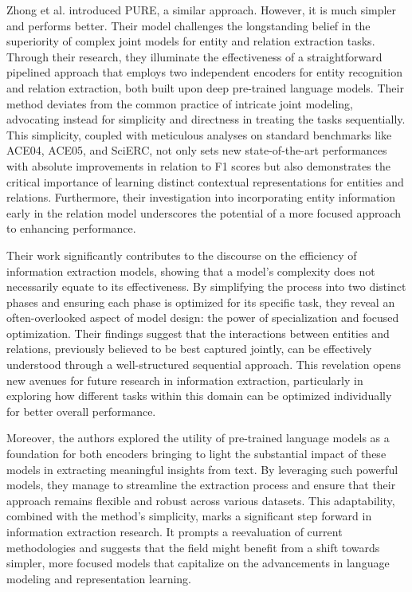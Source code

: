 Zhong et al. \cite{Zhong2020AFE} introduced \ac{PURE}, a similar approach. However, it is much simpler and performs better. Their model challenges the longstanding belief in the superiority of complex joint models for entity and relation extraction tasks. Through their research, they illuminate the effectiveness of a straightforward pipelined approach that employs two independent encoders for entity recognition and relation extraction, both built upon deep pre-trained language models. Their method deviates from the common practice of intricate joint modeling, advocating instead for simplicity and directness in treating the tasks sequentially. This simplicity, coupled with meticulous analyses on standard benchmarks like ACE04, ACE05, and SciERC, not only sets new state-of-the-art performances with absolute improvements in relation to F1 scores but also demonstrates the critical importance of learning distinct contextual representations for entities and relations. Furthermore, their investigation into incorporating entity information early in the relation model underscores the potential of a more focused approach to enhancing performance.

Their work significantly contributes to the discourse on the efficiency of information extraction models, showing that a model's complexity does not necessarily equate to its effectiveness. By simplifying the process into two distinct phases and ensuring each phase is optimized for its specific task, they reveal an often-overlooked aspect of model design: the power of specialization and focused optimization. Their findings suggest that the interactions between entities and relations, previously believed to be best captured jointly, can be effectively understood through a well-structured sequential approach. This revelation opens new avenues for future research in information extraction, particularly in exploring how different tasks within this domain can be optimized individually for better overall performance.

Moreover, the authors explored the utility of pre-trained language models as a foundation for both encoders bringing to light the substantial impact of these models in extracting meaningful insights from text. By leveraging such powerful models, they manage to streamline the extraction process and ensure that their approach remains flexible and robust across various datasets. This adaptability, combined with the method's simplicity, marks a significant step forward in information extraction research. It prompts a reevaluation of current methodologies and suggests that the field might benefit from a shift towards simpler, more focused models that capitalize on the advancements in language modeling and representation learning.

